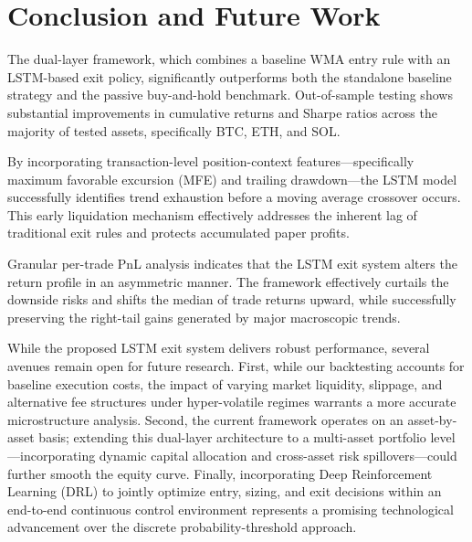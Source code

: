 \documentclass[12pt]{article}
\begin{document}
\section{Conclusion and Future Work}\label{sec:conclusion}

The dual-layer framework, which combines a baseline WMA entry rule with an LSTM-based exit policy, significantly outperforms both the standalone baseline strategy and the passive buy-and-hold benchmark. Out-of-sample testing shows substantial improvements in cumulative returns and Sharpe ratios across the majority of tested assets, specifically BTC, ETH, and SOL.

By incorporating transaction-level position-context features—specifically maximum favorable excursion (MFE) and trailing drawdown—the LSTM model successfully identifies trend exhaustion before a moving average crossover occurs. This early liquidation mechanism effectively addresses the inherent lag of traditional exit rules and protects accumulated paper profits.

Granular per-trade PnL analysis indicates that the LSTM exit system alters the return profile in an asymmetric manner. The framework effectively curtails the downside risks and shifts the median of trade returns upward, while successfully preserving the right-tail gains generated by major macroscopic trends.

While the proposed LSTM exit system delivers robust performance, several avenues remain open for future research. First, while our backtesting accounts for baseline execution costs, the impact of varying market liquidity, slippage, and alternative fee structures under hyper-volatile regimes warrants a more accurate microstructure analysis. Second, the current framework operates on an asset-by-asset basis; extending this dual-layer architecture to a multi-asset portfolio level—incorporating dynamic capital allocation and cross-asset risk spillovers—could further smooth the equity curve. Finally, incorporating Deep Reinforcement Learning (DRL) to jointly optimize entry, sizing, and exit decisions within an end-to-end continuous control environment represents a promising technological advancement over the discrete probability-threshold approach.








\newpage



\end{document}
